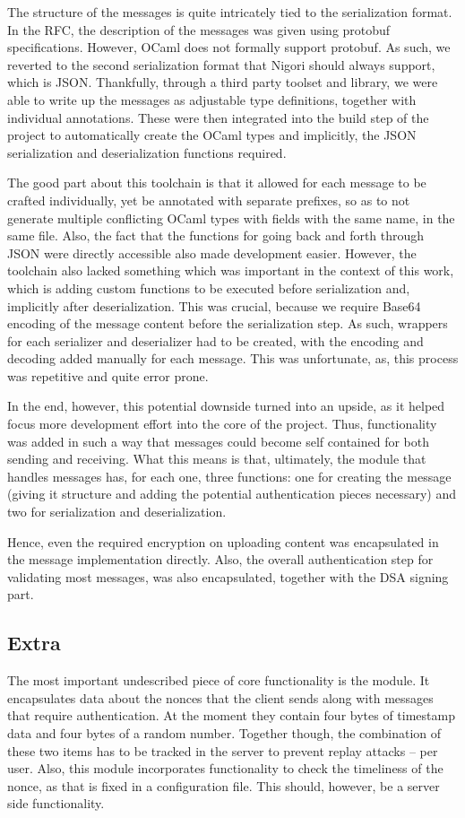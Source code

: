 The structure of the messages is quite intricately tied to the serialization format.
In the RFC, the description of the messages was given using protobuf specifications.
However, OCaml does not formally support protobuf.
As such, we reverted to the second serialization format that Nigori should always support, which is JSON.
Thankfully, through a third party toolset and library, we were able to write up the messages as adjustable type definitions, together with individual annotations.
These were then integrated into the build step of the project to automatically create the OCaml types and implicitly, the JSON serialization and deserialization functions required.

The good part about this toolchain is that it allowed for each message to be crafted individually, yet be annotated with separate prefixes, so as to not generate multiple conflicting OCaml types with fields with the same name, in the same file.
Also, the fact that the functions for going back and forth through JSON were directly accessible also made development easier.
However, the toolchain also lacked something which was important in the context of this work, which is adding custom functions to be executed before serialization and, implicitly after deserialization.
This was crucial, because we require Base64 encoding of the message content before the serialization step.
As such, wrappers for each serializer and deserializer had to be created, with the encoding and decoding added manually for each message.
This was unfortunate, as, this process was repetitive and quite error prone.

In the end, however, this potential downside turned into an upside, as it helped focus more development effort into the core of the project.
Thus, functionality was added in such a way that messages could become self contained for both sending and receiving.
What this means is that, ultimately, the module that handles messages has, for each one, three functions: one for creating the message (giving it structure and adding the potential authentication pieces necessary) and two for serialization and deserialization.

Hence, even the required encryption on uploading content was encapsulated in the message implementation directly.
Also, the overall authentication step for validating most messages, was also encapsulated, together with the DSA signing part.

\subsection{Extra}
The most important undescribed piece of core functionality is the  module.
It encapsulates data about the nonces that the client sends along with messages that require authentication.
At the moment they contain four bytes of timestamp data and four bytes of a random number.
Together though, the combination of these two items has to be tracked in the server to prevent replay attacks -- per user.
Also, this module incorporates functionality to check the timeliness of the nonce, as that is fixed in a configuration file.
This should, however, be a server side functionality.

